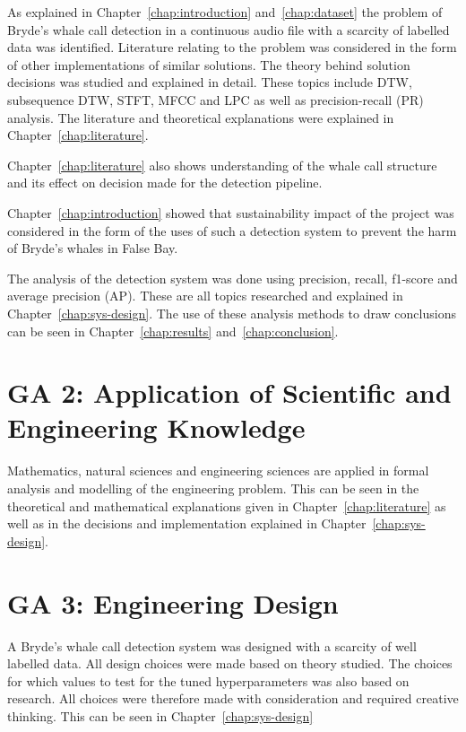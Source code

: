 As explained in Chapter~\ref{chap:introduction} and~\ref{chap:dataset} 
the problem of Bryde's whale call detection in a continuous audio file with 
a scarcity of labelled data was identified. Literature relating to the problem 
was considered in the form of other implementations of similar solutions. 
The theory behind solution decisions was studied and explained in detail. 
These topics include \acs{DTW}, subsequence \acs{DTW}, \acs{STFT}, \acs{MFCC} and \acs{LPC} as well as 
precision-recall (\acs{PR}) analysis. The literature and theoretical explanations 
were explained in Chapter~\ref{chap:literature}.

Chapter~\ref{chap:literature} also shows understanding of the whale 
call structure and its effect on decision made for the detection pipeline.

Chapter~\ref{chap:introduction} showed that sustainability impact 
of the project was considered in the form of the uses 
of such a detection system to prevent the harm of Bryde's 
whales in False Bay.

The analysis of the detection system was done using precision, recall, 
f1-score and average precision (\acs{AP}). These are all topics researched and 
explained in Chapter~\ref{chap:sys-design}. The use of these analysis methods 
to draw conclusions can be seen in Chapter~\ref{chap:results} and~\ref{chap:conclusion}.


\section{GA 2: Application of Scientific and Engineering Knowledge}\label{sec:ga_2}

Mathematics, natural sciences and engineering sciences are 
applied in formal analysis and modelling of the engineering problem. 
This can be seen in the theoretical and mathematical explanations given in 
Chapter~\ref{chap:literature} as well as in the decisions and 
implementation explained in Chapter~\ref{chap:sys-design}.


\section{GA 3: Engineering Design}\label{sec:ga_3}

A Bryde's whale call detection system was designed with a scarcity 
of well labelled data. All design choices were made based on theory studied. 
The choices for which values to test for the tuned hyperparameters was also 
based on research. All choices were therefore made with consideration and 
required creative thinking. 
This can be seen in Chapter~\ref{chap:sys-design}


